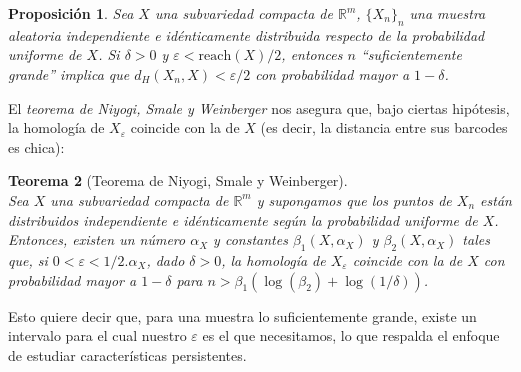\documentclass[12pt,a4paper]{article}
\newtheorem{theorem}{Teorema}[section]
\newtheorem{proposition}[theorem]{Proposición}
\begin{document}
\begin{proposition}
    Sea $X$ una subvariedad compacta de $\mathbb{R}^m$, $\{X_n\}_n$ una muestra aleatoria independiente e idénticamente distribuida respecto de la probabilidad uniforme de $X$. Si $\delta>0$ y $\varepsilon < \text{reach}(X)/2$, entonces $n$ ``suficientemente grande'' implica que $d_H(X_n, X) < \varepsilon/2$ con probabilidad mayor a $1 - \delta$.
\end{proposition}
El \textit{teorema de Niyogi, Smale y Weinberger} nos asegura que, bajo ciertas hipótesis, la homología de $X_\varepsilon$ coincide con la de $X$ (es decir, la distancia entre sus barcodes es chica):
\begin{theorem}[Teorema de Niyogi, Smale y Weinberger]
\\
Sea $X$ una subvariedad compacta de $\mathbb{R}^m$ y supongamos que los puntos de $X_n$ están distribuidos independiente e idénticamente según la probabilidad uniforme de $X$.
\\
Entonces, existen un número $\alpha_X$ y constantes $\beta_1(X, \alpha_X)$ y $\beta_2(X, \alpha_X)$ tales que, si $0 < \varepsilon < 1/2.\alpha_X$, dado $\delta > 0$, la homología de $X_{\varepsilon}$ coincide con la de $X$ con probabilidad mayor a $1 - \delta$ para $n > \beta_1(\log(\beta_2) + \log(1/\delta))$.
\end{theorem}
Esto quiere decir que, para una muestra lo suficientemente grande, existe un intervalo para el cual nuestro $\varepsilon$ es el que necesitamos, lo que respalda el enfoque de estudiar características persistentes.
\\
\\
\\
\end{document}
